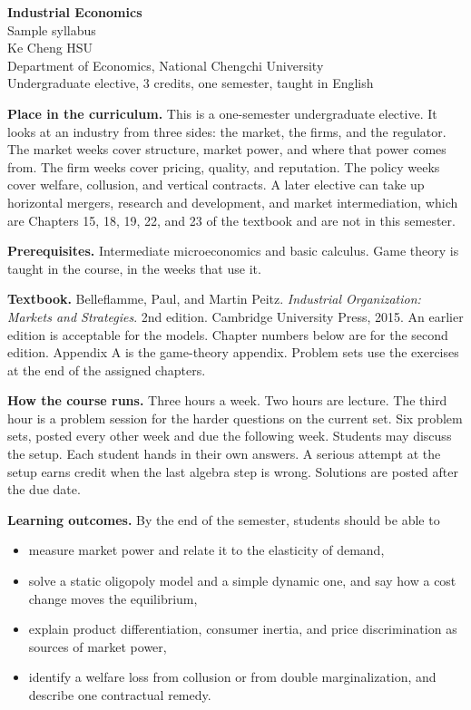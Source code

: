 \documentclass[11pt]{article}
\begin{document}
\begin{center}
{\Large\bfseries Industrial Economics}\\[0.3em]
Sample syllabus\\[0.15em]
Ke Cheng HSU\\
Department of Economics, National Chengchi University\\
Undergraduate elective, 3 credits, one semester, taught in English
\end{center}

\textbf{Place in the curriculum.}
This is a one-semester undergraduate elective. It looks at an industry from three sides: the market, the firms, and the regulator. The market weeks cover structure, market power, and where that power comes from. The firm weeks cover pricing, quality, and reputation. The policy weeks cover welfare, collusion, and vertical contracts. A later elective can take up horizontal mergers, research and development, and market intermediation, which are Chapters 15, 18, 19, 22, and 23 of the textbook and are not in this semester.

\textbf{Prerequisites.}
Intermediate microeconomics and basic calculus. Game theory is taught in the course, in the weeks that use it.

\textbf{Textbook.}
Belleflamme, Paul, and Martin Peitz. \emph{Industrial Organization: Markets and Strategies}. 2nd edition. Cambridge University Press, 2015. An earlier edition is acceptable for the models. Chapter numbers below are for the second edition. Appendix A is the game-theory appendix. Problem sets use the exercises at the end of the assigned chapters.

\textbf{How the course runs.}
Three hours a week. Two hours are lecture. The third hour is a problem session for the harder questions on the current set. Six problem sets, posted every other week and due the following week. Students may discuss the setup. Each student hands in their own answers. A serious attempt at the setup earns credit when the last algebra step is wrong. Solutions are posted after the due date.

\textbf{Learning outcomes.}
By the end of the semester, students should be able to
\begin{itemize}
\item measure market power and relate it to the elasticity of demand,
\item solve a static oligopoly model and a simple dynamic one, and say how a cost change moves the equilibrium,
\item explain product differentiation, consumer inertia, and price discrimination as sources of market power,
\item identify a welfare loss from collusion or from double marginalization, and describe one contractual remedy.
\end{itemize}
\end{document}
